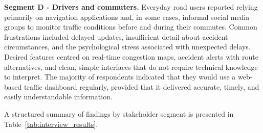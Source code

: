 \documentclass[12pt,a4paper]{report}
\begin{document}
\textbf{Segment D - Drivers and commuters.} Everyday road users reported relying primarily on navigation applications and, in some
cases, informal social media groups to monitor traffic conditions before and during their
commutes. Common frustrations included delayed updates, insufficient detail about accident
circumstances, and the psychological stress associated with unexpected delays. Desired
features centred on real-time congestion maps, accident alerts with route alternatives,
and clean, simple interfaces that do not require technical knowledge to interpret. The
majority of respondents indicated that they would use a web-based traffic dashboard
regularly, provided that it delivered accurate, timely, and easily understandable
information.

A structured summary of findings by stakeholder segment is presented in
Table~\ref{tab:interview_results}.

\renewcommand{\arraystretch}{1.5}
\end{document}
